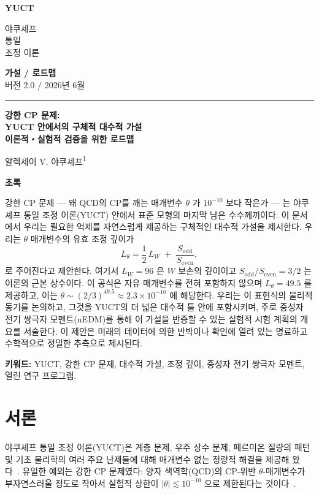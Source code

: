 \documentclass[11pt,a4paper]{article}
\newcommand{\makeheader}{%
	\noindent
	\begin{minipage}{0.17\textwidth}
		\raggedright
		{\sffamily\bfseries\color{skyblue}\fontsize{46}{46}\selectfont YUCT}%
	\end{minipage}%
	\hspace{30pt}
	\begin{minipage}{0.32\textwidth}
		\raggedright
		{\sffamily\fontsize{11}{13}\selectfont 야쿠셰프\\ 통일\\ 조정 이론}%
	\end{minipage}%
	\hfill
	\begin{minipage}{0.38\textwidth}
		\raggedleft
		{\sffamily\bfseries 가설 / 로드맵}\\ 
		{\sffamily 버전 2.0 / 2026년 6월}\\ 
	\end{minipage}
	\par\vspace{5pt}
	\noindent\textcolor{gold}{\rule{\textwidth}{1.6pt}}
	\par\vspace{0pt}
}
\begin{document}
	\thispagestyle{firstpage}
	\makeheader
	
	\vspace{0cm}
	{\LARGE\bfseries 강한 CP 문제:\\[0.1cm] YUCT 안에서의 구체적 대수적 가설\\[0.2cm] \Large 이론적・실험적 검증을 위한 로드맵 \par}
	\vspace{0.2cm}
	
	{\large 알렉세이 V. 야쿠셰프\textsuperscript{1}} \\
	\vspace{0.0cm}
	
	{\color{darkblue}\textbf{\LARGE 초록}} \par
	{\large
		\noindent
		강한 CP 문제 — 왜 QCD의 CP를 깨는 매개변수 \(\theta\) 가 \(10^{-10}\) 보다 작은가 — 는 야쿠셰프 통일 조정 이론(YUCT) 안에서 표준 모형의 마지막 남은 수수께끼이다. 이 문서에서 우리는 필요한 억제를 자연스럽게 제공하는 구체적인 대수적 가설을 제시한다. 우리는 \(\theta\) 매개변수의 유효 조정 깊이가
		\[
		L_\theta = \frac{1}{2}\,L_W \;+\; \frac{S_{\mathrm{odd}}}{S_{\mathrm{even}}},
		\]
		로 주어진다고 제안한다. 여기서 \(L_W = 96\) 은 \(W\) 보손의 깊이이고 \(S_{\mathrm{odd}}/S_{\mathrm{even}} = 3/2\) 는 이론의 근본 상수이다. 이 공식은 자유 매개변수를 전혀 포함하지 않으며 \(L_\theta = 49.5\) 를 제공하고, 이는 \(\theta \sim (2/3)^{49.5} \approx 2.3 \times 10^{-10}\) 에 해당한다. 우리는 이 표현식의 물리적 동기를 논의하고, 그것을 YUCT의 더 넓은 대수적 틀 안에 포함시키며, 주로 중성자 전기 쌍극자 모멘트(nEDM)를 통해 이 가설을 반증할 수 있는 실험적 시험 계획의 개요를 서술한다. 이 제안은 미래의 데이터에 의한 반박이나 확인에 열려 있는 명료하고 수학적으로 정밀한 추측으로 제시된다.
	}
	
	\vspace{0.1cm}
	\noindent
	{\color{darkblue}\textbf{키워드:}} YUCT, 강한 CP 문제, 대수적 가설, 조정 깊이, 중성자 전기 쌍극자 모멘트, 열린 연구 프로그램.
	\vspace{0.4cm}
	
	\clearpage
	\tableofcontents
	\newpage
	
	\section{서론}
	\label{sec:intro}
	
	야쿠셰프 통일 조정 이론(YUCT)은 계층 문제, 우주 상수 문제, 페르미온 질량의 패턴 및 기초 물리학의 여러 주요 난제들에 대해 매개변수 없는 정량적 해결을 제공해 왔다~\cite{Y1,Y3,Y4}. 유일한 예외는 강한 CP 문제였다: 양자 색역학(QCD)의 CP-위반 \(\theta\)-매개변수가 부자연스러울 정도로 작아서 실험적 상한이 \(|\theta| \lesssim 10^{-10}\) 으로 제한된다는 것이다~\cite{nEDM2020}.
	
\end{document}
